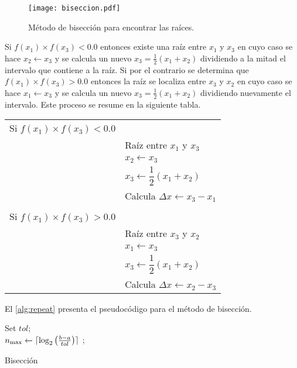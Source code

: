 \begin{figure}[H]
\centering
\texttt{[image: biseccion.pdf]}
\caption{Método de bisección para encontrar las raíces.}
\label{fig:bisection}
\end{figure}

Si $f (x_1) \times f (x_3) < 0.0 $ entonces existe una raíz entre $x_1$ y $x_3$ en cuyo caso se hace $x_2	\leftarrow x_3$ y se calcula un nuevo ${x_3} = \frac{1}{2}({x_1} + {x_2})$ dividiendo a la mitad el intervalo que contiene a la raíz. Si por el contrario se determina que $f (x_1) \times f (x_3) > 0.0 $ entonces la raíz se localiza entre $x_3$ y $x_2$ en cuyo caso se hace $x_1	\leftarrow x_3$ y se calcula un nuevo ${x_3} = \frac{1}{2}({x_1} + {x_2})$ dividiendo nuevamente el intervalo. Este proceso se resume en la siguiente tabla.
\begin{table}[H]
  \centering
  \begin{tabular}{ll}
	Si $f (x_1) \times f (x_3) < 0.0 $\\ & Raíz entre $x_1$ y $x_3$\\ 
	  & $x_2	\leftarrow x_3$ \\
	  & $x_3 \leftarrow \dfrac{1}{2} (x_1 + x_2)$ \\
	  & Calcula $\Delta x \leftarrow x_3-x_1$ \\\\
	Si $f (x_1) \times f (x_3) > 0.0 $\\ & Raíz entre $x_3$ y $x_2$\\ 
      & $x_1	\leftarrow x_3$ \\
      & $x_3 \leftarrow \dfrac{1}{2} (x_1 + x_2)$ \\
      & Calcula $\Delta x \leftarrow x_2-x_3$
  \end{tabular}
\end{table}

El \cref{alg:repeat} presenta el pseudocódigo para el método de bisección.
\begin{algorithm}[h]
\SetAlgoLined
{}
Set $tol$;\\
$n_{\max}  \leftarrow \lceil\log_2\left(\frac{b - a}{tol}\right)\rceil$ ;\\
\BlankLine
\caption{Bisección}
\label{alg:repeat}
\end{algorithm}

